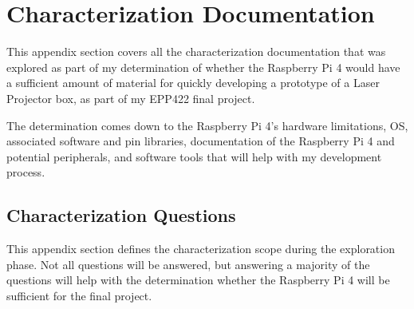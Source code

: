 \documentclass[journal]{IEEEtran}
\begin{document}
    \appendices
    \section{Characterization Documentation}
    This appendix section covers all the characterization documentation that was explored as part of my determination of whether the Raspberry Pi 4 would have a sufficient amount of material for quickly developing a prototype of a
    Laser Projector box, as part of my EPP422 final project.
    
    The determination comes down to the Raspberry Pi 4's hardware limitations, OS, associated software and pin libraries, documentation of the Raspberry Pi 4 and potential peripherals, and software tools that 
    will help with my development process.

    \subsection{Characterization Questions}
    This appendix section defines the characterization scope during the exploration phase. Not all questions will be answered, but answering a majority of the questions will help with the determination whether
    the Raspberry Pi 4 will be sufficient for the final project.
\end{document}
